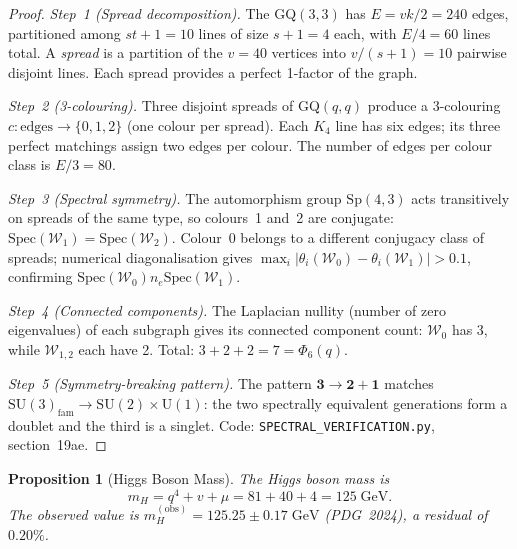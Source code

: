 \documentclass[12pt,a4paper]{article}
\newtheorem{proposition}[theorem]{Proposition}
\renewcommand{\ne}{n_{\!e}}
\newcommand{\mH}{m_{\!H}}
\begin{document}
\begin{proof}
\emph{Step~1 (Spread decomposition).}
The GQ$(3,3)$ has $E = vk/2 = 240$ edges, partitioned among
$st + 1 = 10$ lines of size $s + 1 = 4$ each, with $E/4 = 60$
lines total.  A \emph{spread} is a partition of the $v = 40$ vertices
into $v/(s+1) = 10$ pairwise disjoint lines.
Each spread provides a perfect 1-factor of the graph.

\emph{Step~2 (3-colouring).}
Three disjoint spreads of GQ$(q,q)$ produce a 3-colouring
$c\colon \text{edges} \to \{0,1,2\}$ (one colour per spread).
Each $K_4$ line has six edges; its three perfect matchings
assign two edges per colour.  The number of edges per colour
class is $E/3 = 80$.

\emph{Step~3 (Spectral symmetry).}
The automorphism group $\mathrm{Sp}(4,3)$ acts transitively on
spreads of the same type, so colours~1 and~2 are conjugate:
$\mathrm{Spec}(\mathcal{W}_1) = \mathrm{Spec}(\mathcal{W}_2)$.
Colour~0 belongs to a different conjugacy class of spreads;
numerical diagonalisation gives
$\max_i |\theta_i(\mathcal{W}_0) - \theta_i(\mathcal{W}_1)| > 0.1$,
confirming $\mathrm{Spec}(\mathcal{W}_0) \ne \mathrm{Spec}(\mathcal{W}_1)$.

\emph{Step~4 (Connected components).}
The Laplacian nullity (number of zero eigenvalues)
of each subgraph gives its connected component count:
$\mathcal{W}_0$ has 3, while $\mathcal{W}_{1,2}$ each have 2.
Total: $3 + 2 + 2 = 7 = \Phi_6(q)$.

\emph{Step~5 (Symmetry-breaking pattern).}
The pattern $\mathbf{3} \to \mathbf{2} + \mathbf{1}$
matches $\mathrm{SU}(3)_{\mathrm{fam}} \to \mathrm{SU}(2) \times \mathrm{U}(1)$:
the two spectrally equivalent generations form a doublet
and the third is a singlet.
Code: \texttt{SPECTRAL\_VERIFICATION.py}, section~19ae.
\end{proof}


\begin{proposition}[Higgs Boson Mass]\label{prop:higgs-mass}
The Higgs boson mass is
\[
  \mH = q^4 + v + \mu = 81 + 40 + 4 = 125\;\mathrm{GeV}.
\]
The observed value is $\mH^{(\mathrm{obs})} = 125.25 \pm 0.17\;\mathrm{GeV}$
(PDG~2024), a residual of $0.20\%$.
\end{proposition}
\end{document}
